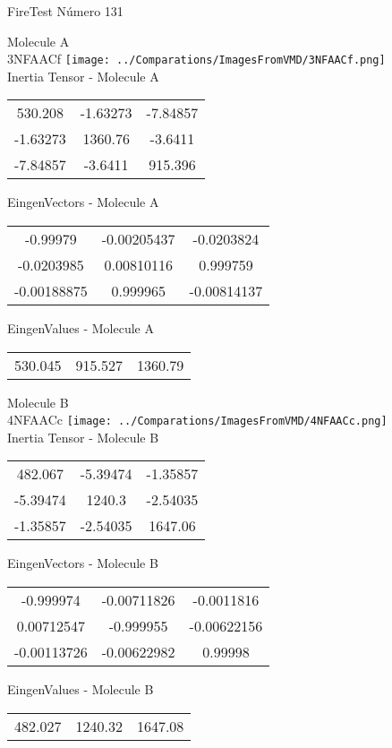 \vtab[-2cm]
\begin{center}
{\large FireTest \tab Número 131}
\end{center}
\begin{multicols}{2}
\begin{center}

Molecule A \\ 
3NFAACf
\texttt{[image: ../Comparations/ImagesFromVMD/3NFAACf.png]}
\\
Inertia Tensor - Molecule A \\
\vtab

\begin{tabular}{|c c c|}
530.208	 & 	-1.63273	 & 	-7.84857	 \\
-1.63273	 & 	1360.76	 & 	-3.6411	 \\
-7.84857	 & 	-3.6411	 & 	915.396
\end{tabular}

\vtab
 EingenVectors - Molecule A     \\
\vtab
\begin{tabular}{|c c c|}
-0.99979	 & 	-0.00205437	 & 	-0.0203824	 \\
-0.0203985	 & 	0.00810116	 & 	0.999759	 \\
-0.00188875	 & 	0.999965	 & 	-0.00814137
\end{tabular}

\vtab
 EingenValues - Molecule A     \\
\vtab
\begin{tabular}{|c c c|}
530.045	 & 	915.527	 & 	1360.79	 \\
\end{tabular}
\columnbreak

Molecule B \\ 
4NFAACc
\texttt{[image: ../Comparations/ImagesFromVMD/4NFAACc.png]}
\\
Inertia Tensor - Molecule B \\
\vtab

\begin{tabular}{|c c c|}
482.067	 & 	-5.39474	 & 	-1.35857	 \\
-5.39474	 & 	1240.3	 & 	-2.54035	 \\
-1.35857	 & 	-2.54035	 & 	1647.06
\end{tabular}

\vtab
 EingenVectors - Molecule B     \\
\vtab
\begin{tabular}{|c c c|}
-0.999974	 & 	-0.00711826	 & 	-0.0011816	 \\
0.00712547	 & 	-0.999955	 & 	-0.00622156	 \\
-0.00113726	 & 	-0.00622982	 & 	0.99998
\end{tabular}

\vtab
 EingenValues - Molecule B     \\
\vtab
\begin{tabular}{|c c c|}
482.027	 & 	1240.32	 & 	1647.08	 \\
\end{tabular}

\end{center}
\end{multicols}
